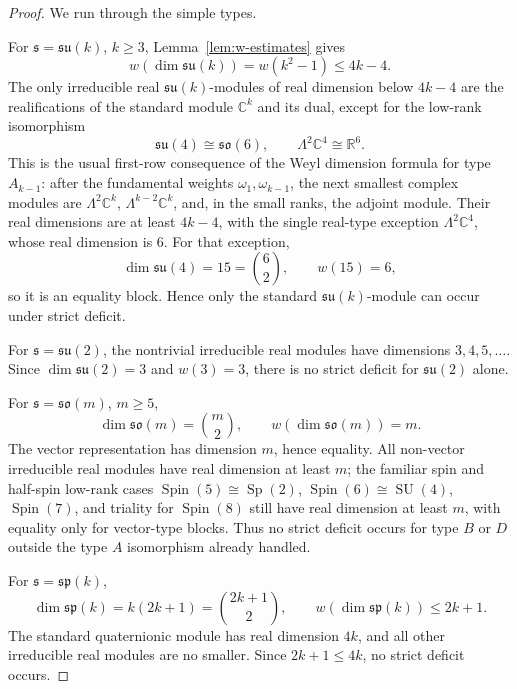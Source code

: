 \documentclass[11pt]{article}
\theoremstyle{remark}
\newcommand{\RR}{\mathbb{R}}
\newcommand{\CC}{\mathbb{C}}
\newcommand{\fs}{\mathfrak{s}}
\newcommand{\so}{\mathfrak{so}}
\newcommand{\su}{\mathfrak{su}}
\newcommand{\spalg}{\mathfrak{sp}}
\newcommand{\Spin}{\operatorname{Spin}}
\newcommand{\SU}{\operatorname{SU}}
\newcommand{\Sp}{\operatorname{Sp}}
\begin{document}
\begin{proof}
We run through the simple types.

For \(\fs=\su(k)\), \(k\geq 3\), Lemma~\ref{lem:w-estimates} gives
\[
  w(\dim\su(k))=w(k^2-1)\leq 4k-4.
\]
The only irreducible real \(\su(k)\)-modules of real dimension below \(4k-4\) are the realifications of the standard module \(\CC^k\) and its dual, except for the low-rank isomorphism
\[
  \su(4)\cong\so(6),
  \qquad
  \Lambda^2\CC^4\cong\RR^6.
\]
This is the usual first-row consequence of the Weyl dimension formula for type \(A_{k-1}\): after the fundamental weights \(\omega_1,\omega_{k-1}\), the next smallest complex modules are \(\Lambda^2\CC^k\), \(\Lambda^{k-2}\CC^k\), and, in the small ranks, the adjoint module.  Their real dimensions are at least \(4k-4\), with the single real-type exception \(\Lambda^2\CC^4\), whose real dimension is \(6\).  For that exception,
\[
  \dim\su(4)=15=\binom62,
  \qquad
  w(15)=6,
\]
so it is an equality block.  Hence only the standard \(\su(k)\)-module can occur under strict deficit.

For \(\fs=\su(2)\), the nontrivial irreducible real modules have dimensions \(3,4,5,\ldots\).  Since \(\dim\su(2)=3\) and \(w(3)=3\), there is no strict deficit for \(\su(2)\) alone.

For \(\fs=\so(m)\), \(m\geq 5\),
\[
  \dim\so(m)=\binom m2,
  \qquad
  w(\dim\so(m))=m.
\]
The vector representation has dimension \(m\), hence equality.  All non-vector irreducible real modules have real dimension at least \(m\); the familiar spin and half-spin low-rank cases \(\Spin(5)\cong\Sp(2)\), \(\Spin(6)\cong\SU(4)\), \(\Spin(7)\), and triality for \(\Spin(8)\) still have real dimension at least \(m\), with equality only for vector-type blocks.  Thus no strict deficit occurs for type \(B\) or \(D\) outside the type \(A\) isomorphism already handled.

For \(\fs=\spalg(k)\),
\[
  \dim\spalg(k)=k(2k+1)=\binom{2k+1}{2},
  \qquad
  w(\dim\spalg(k))
  \leq 2k+1.
\]
The standard quaternionic module has real dimension \(4k\), and all other irreducible real modules are no smaller.  Since \(2k+1\leq 4k\), no strict deficit occurs.


\end{proof}
\end{document}
